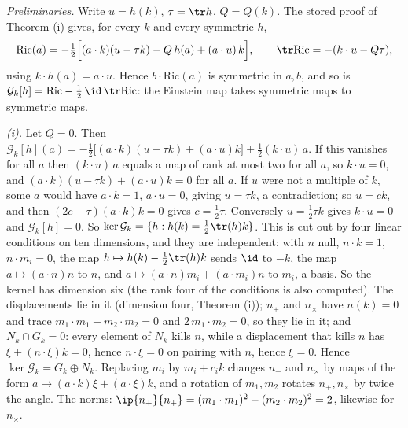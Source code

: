 \emph{Preliminaries.} Write $u = h(k)$, $\tau = \tr h$, $Q = Q(k)$. The stored proof of Theorem (i) gives, for every $k$ and every symmetric $h$,
\[
\mathrm{Ric}(a) = -\tfrac12\Bigl[(a \cdot k)(u - \tau k) - Q\,h(a) + (a \cdot u)\,k\Bigr], \qquad \tr\mathrm{Ric} = -(k \cdot u - Q\tau),
\]
using $k \cdot h(a) = a \cdot u$. Hence $b \cdot \mathrm{Ric}(a)$ is symmetric in $a, b$, and so is $\mathcal{G}_{k}[h] = \mathrm{Ric} - \tfrac12\,\id\,\tr\mathrm{Ric}$: the Einstein map takes symmetric maps to symmetric maps.

\emph{(i).} Let $Q = 0$. Then $\mathcal{G}_{k}[h](a) = -\tfrac12\bigl[(a \cdot k)(u - \tau k) + (a \cdot u)k\bigr] + \tfrac12 (k \cdot u)\,a$. If this vanishes for all $a$ then $(k \cdot u)\,a$ equals a map of rank at most two for all $a$, so $k \cdot u = 0$, and $(a \cdot k)(u - \tau k) + (a \cdot u)k = 0$ for all $a$. If $u$ were not a multiple of $k$, some $a$ would have $a \cdot k = 1$, $a \cdot u = 0$, giving $u = \tau k$, a contradiction; so $u = ck$, and then $(2c - \tau)(a \cdot k)k = 0$ gives $c = \tfrac12\tau$. Conversely $u = \tfrac12\tau k$ gives $k \cdot u = 0$ and $\mathcal{G}_{k}[h] = 0$. So $\ker\mathcal{G}_{k} = \{h : h(k) = \tfrac12\tr(h)k\}$. This is cut out by four linear conditions on ten dimensions, and they are independent: with $n$ null, $n \cdot k = 1$, $n \cdot m_{i} = 0$, the map $h \mapsto h(k) - \tfrac12\tr(h)k$ sends $\id$ to $-k$, the map $a \mapsto (a \cdot n)n$ to $n$, and $a \mapsto (a \cdot n)m_{i} + (a \cdot m_{i})n$ to $m_{i}$, a basis. So the kernel has dimension six (the rank four of the conditions is also computed). The displacements lie in it (dimension four, Theorem (i)); $n_{+}$ and $n_{\times}$ have $n(k) = 0$ and trace $m_{1} \cdot m_{1} - m_{2} \cdot m_{2} = 0$ and $2\,m_{1} \cdot m_{2} = 0$, so they lie in it; and $N_{k} \cap G_{k} = 0$: every element of $N_{k}$ kills $n$, while a displacement that kills $n$ has $\xi + (n \cdot \xi)k = 0$, hence $n \cdot \xi = 0$ on pairing with $n$, hence $\xi = 0$. Hence $\ker\mathcal{G}_{k} = G_{k} \oplus N_{k}$. Replacing $m_{i}$ by $m_{i} + c_{i}k$ changes $n_{+}$ and $n_{\times}$ by maps of the form $a \mapsto (a \cdot k)\xi + (a \cdot \xi)k$, and a rotation of $m_{1}, m_{2}$ rotates $n_{+}, n_{\times}$ by twice the angle. The norms: $\ip{n_{+}}{n_{+}} = (m_{1} \cdot m_{1})^{2} + (m_{2} \cdot m_{2})^{2} = 2$, likewise for $n_{\times}$.


